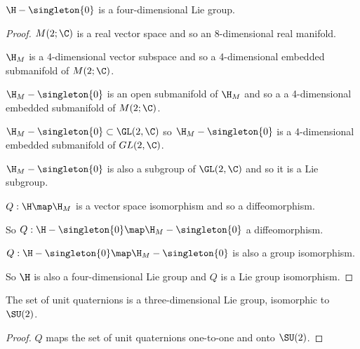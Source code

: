 \documentclass[oneside,12pt]{amsart}
\begin{document}
\begin{lemma}
$\H -\singleton{0}$ is a four-dimensional Lie group.
\end{lemma}
\begin{proof}
$M(2; \C)$ is a real vector space and so an 8-dimensional real manifold. 

$\H_M$ is a 4-dimensional vector subspace and so a 4-dimensional embedded submanifold of $M(2; \C)$.

$\H_M- \singleton{0}$ is an open submanifold of $\H_M$ and so a a 4-dimensional embedded submanifold of $M(2; \C)$.


$\H_M- \singleton{0}\subset \GL(2,\C)$ so $\H_M- \singleton{0}$ is a 4-dimensional embedded submanifold of $GL(2,\C)$.


$\H_M- \singleton{0}$ is also a subgroup of $\GL(2,\C)$ and so it is a Lie subgroup.

$Q:\H\map\H_M$ is a vector space isomorphism and so a diffeomorphism.

So $Q:\H - \singleton{0}\map\H_M- \singleton{0}$ a diffeomorphism.

$Q:\H- \singleton{0}\map\H_M- \singleton{0}$ is also a group isomorphism.

So $\H$ is also a four-dimensional Lie group and $Q$ is a Lie group isomorphism.
\end{proof}

\begin{corollary}
The set of unit quaternions is a three-dimensional Lie group, isomorphic to $\SU(2)$.
\end{corollary}
\begin{proof}
$Q$ maps the set of unit quaternions one-to-one and onto $\SU(2)$.
\end{proof}




\end{document}
